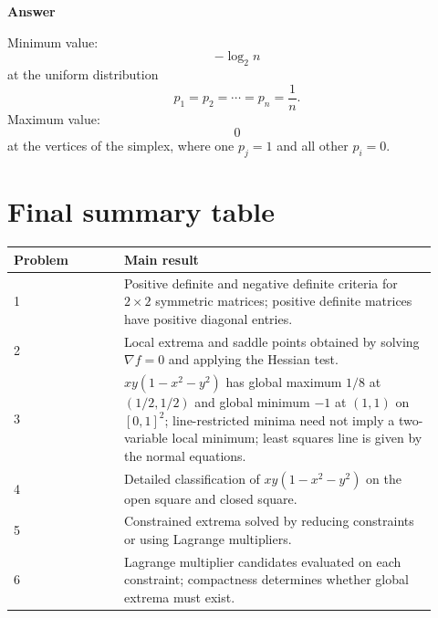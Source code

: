 \documentclass[11pt]{article}
\newenvironment{answerbox}[1]{\par\medskip\noindent\textcolor{linegreen}{\textbf{#1}}\par\smallskip}{\par\medskip}
\newcommand{\grad}{\nabla}
\begin{document}
\begin{answerbox}{Answer}
Minimum value:
\[
-\log_2 n
\]
at the uniform distribution
\[
p_1=p_2=\cdots=p_n=\frac1n.
\]
Maximum value:
\[
0
\]
at the vertices of the simplex, where one $p_j=1$ and all other $p_i=0$.
\end{answerbox}

\newpage
\section*{Final summary table}

\begin{center}
\renewcommand{\arraystretch}{1.35}
\begin{tabular}{|p{0.24\linewidth}|p{0.68\linewidth}|}
\hline
\textbf{Problem} & \textbf{Main result}\\
\hline
1 & Positive definite and negative definite criteria for $2\times2$ symmetric matrices; positive definite matrices have positive diagonal entries.\\
\hline
2 & Local extrema and saddle points obtained by solving $\grad f=0$ and applying the Hessian test.\\
\hline
3 & $xy(1-x^2-y^2)$ has global maximum $1/8$ at $(1/2,1/2)$ and global minimum $-1$ at $(1,1)$ on $[0,1]^2$; line-restricted minima need not imply a two-variable local minimum; least squares line is given by the normal equations.\\
\hline
4 & Detailed classification of $xy(1-x^2-y^2)$ on the open square and closed square.\\
\hline
5 & Constrained extrema solved by reducing constraints or using Lagrange multipliers.\\
\hline
6 & Lagrange multiplier candidates evaluated on each constraint; compactness determines whether global extrema must exist.\\
\hline
\end{tabular}
\end{center}
\end{document}
